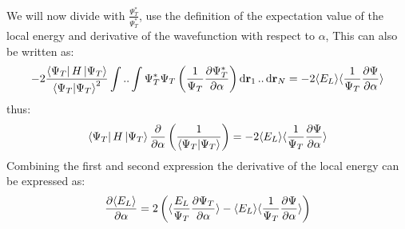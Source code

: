 \documentclass[a4paper, 10pt]{article}
\begin{document}
\begin{appendices}
\begin{align}
		\end{align}
		We will now divide with $\frac{\Psi_{T}^{*}}{\Psi_{T}^{*}}$,
		use the definition of the expectation value of the local energy and derivative of the wavefunction with respect to $\alpha$,
		This can also be written as:
		\begin{align}
		-2\frac{\bra{\Psi_{T}}H\ket{\Psi_{T}}}{\braket{\Psi_{T}}^{2}}\int..\int \Psi_{T}^{*}\Psi_{T}\left(\frac{1}{\Psi_{T}}\pdv{\Psi_{T}^{*}}{\alpha}\right)\dd{\bold{r}_{1}}..\dd{\bold{r}_{N}}
		= -2\langle E_{L} \rangle \langle \frac{1}{\Psi_{T}}\pdv{\Psi}{\alpha}\rangle
		\end{align}
		thus:
		\begin{align}
		\bra{\Psi_{T}}H\ket{\Psi_{T}}\pdv{\alpha}\left(\frac{1}{\braket{\Psi_{T}}}\right)
		= -2\langle E_{L} \rangle \langle \frac{1}{\Psi_{T}}\pdv{\Psi}{\alpha}\rangle
		\end{align}
		Combining the first and second expression the derivative of the local energy can
		be expressed as:
		\begin{align}
		\pdv{\langle E_{L} \rangle }{\alpha} =
		2\left(\langle \frac{E_{L}}{\Psi_{T}}\pdv{\Psi_{T}}{\alpha} \rangle -
		\langle E_{L} \rangle \langle \frac{1}{\Psi_{T}}\pdv{\Psi}{\alpha}\rangle\right)
		\end{align}

\end{appendices}
\end{document}
